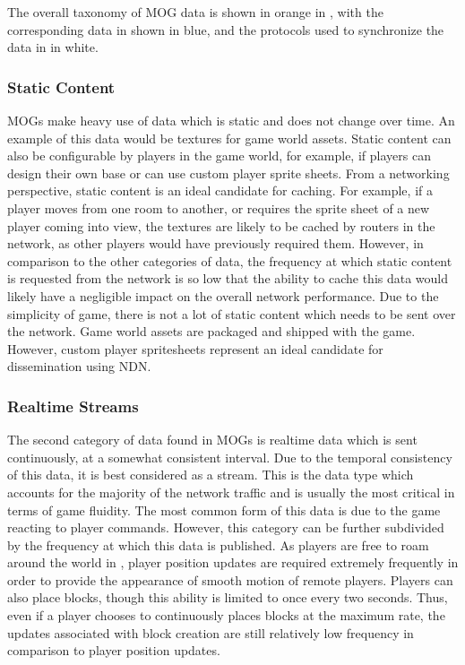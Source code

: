 The overall taxonomy of MOG data is shown in orange in , with the corresponding data in \game{} shown in blue, and the protocols used to synchronize the data in \game{} in white.

\subsubsection*{Static Content}
MOGs make heavy use of data which is static and does not change over time. An example of this data would be textures for game world assets. Static content can also be configurable by players in the game world, for example, if players can design their own base or can use custom player sprite sheets. From a networking perspective, static content is an ideal candidate for caching. For example, if a player moves from one room to another, or requires the sprite sheet of a new player coming into view, the textures are likely to be cached by routers in the network, as other players would have previously required them. However, in comparison to the other categories of data, the frequency at which static content is requested from the network is so low that the ability to cache this data would likely have a negligible impact on the overall network performance. Due to the simplicity of game, there is not a lot of static content which needs to be sent over the network. Game world assets are packaged and shipped with the game. However, custom player spritesheets represent an ideal candidate for dissemination using NDN.

\subsubsection*{Realtime Streams}
The second category of data found in MOGs is realtime data which is sent continuously, at a somewhat consistent interval. Due to the temporal consistency of this data, it is best considered as a stream. This is the data type which accounts for the majority of the network traffic and is usually the most critical in terms of game fluidity. The most common form of this data is due to the game reacting to player commands. However, this category can be further subdivided by the frequency at which this data is published. As players are free to roam around the world in \game{}, player position updates are required extremely frequently in order to provide the appearance of smooth motion of remote players. Players can also place blocks, though this ability is limited to once every two seconds. Thus, even if a player chooses to continuously places blocks at the maximum rate, the updates associated with block creation are still relatively low frequency in comparison to player position updates.




